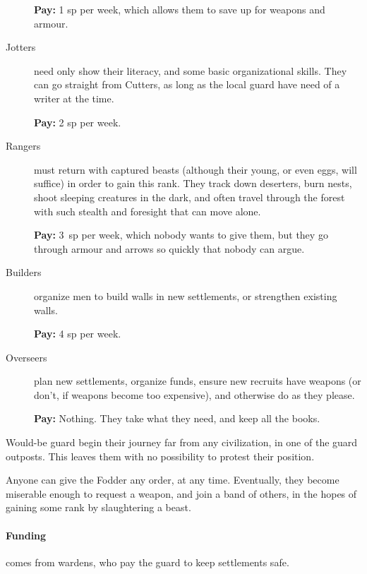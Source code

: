 \begin{multicols}{2}
\begin{description}
  \textbf{Pay:} 1 \gls{sp} per week, which allows them to save up for weapons and armour.

  \item[Jotters]
  \label{jotter}%
  need only show their literacy, and some basic organizational skills.
  They can go straight from Cutters, as long as the local \gls{guard} have need of a writer at the time.

  \textbf{Pay:} 2 \gls{sp} per week.

  \item[Rangers]
  \label{ranger}
  must return with captured beasts (although their young, or even eggs, will suffice) in order to gain this rank.
  They track down deserters, burn nests, shoot sleeping creatures in the dark, and often travel through the forest with such stealth and foresight that can move alone.
  
  \textbf{Pay:} 3~\gls{sp} per week, which nobody wants to give them, but they go through armour and arrows so quickly that nobody can argue.

  \item[Builders]
  organize men to build walls in new settlements, or strengthen existing walls.

  \textbf{Pay:} 4 \gls{sp} per week.

  \item[Overseers]
  plan new settlements, organize funds, ensure new recruits have weapons (or don't, if weapons become too expensive), and otherwise do as they please.

  \textbf{Pay:} Nothing.
  They take what they need, and keep all the books.

\end{description}

\noindent
Would-be \gls{guard} begin their journey far from any civilization, in one of the \gls{guard} outposts.
This leaves them with no possibility to protest their position.

Anyone can give the Fodder any order, at any time.
Eventually, they become miserable enough to request a weapon, and join a band of others, in the hopes of gaining some rank by slaughtering a beast.


\paragraph{Funding}
comes from wardens, who pay the guard to keep settlements safe.


\end{multicols}
